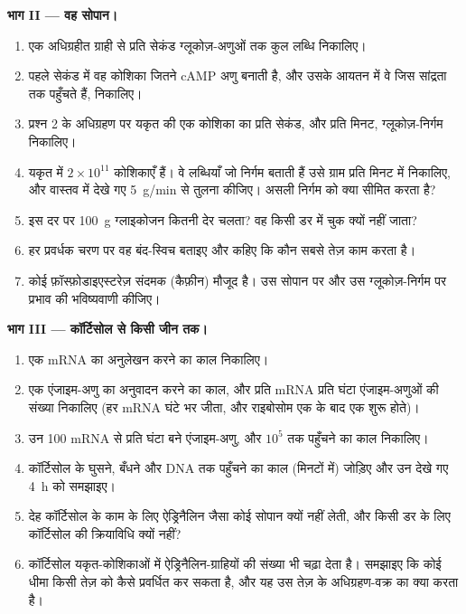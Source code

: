 \begin{problem}
\medskip
\noindent\textbf{भाग II --- वह सोपान।}
\begin{enumerate}[resume]
  \item एक अधिग्रहीत ग्राही से प्रति सेकंड ग्लूकोज़-अणुओं तक
        कुल लब्धि निकालिए।
  \item पहले सेकंड में वह कोशिका जितने cAMP अणु बनाती है, और
        उसके आयतन में वे जिस सांद्रता तक पहुँचते हैं, निकालिए।
  \item प्रश्न 2 के अधिग्रहण पर यकृत की एक कोशिका का प्रति सेकंड,
        और प्रति मिनट, ग्लूकोज़-निर्गम निकालिए।
  \item यकृत में $2\times 10^{11}$ कोशिकाएँ हैं। वे लब्धियाँ जो
        निर्गम बताती हैं उसे ग्राम प्रति मिनट में निकालिए, और वास्तव में देखे गए
        \qty{5}{g/min} से तुलना कीजिए। असली निर्गम को क्या सीमित करता है?
  \item इस दर पर \qty{100}{g} ग्लाइकोजन कितनी देर चलता? वह किसी डर में
        चुक क्यों नहीं जाता?
  \item हर प्रवर्धक चरण पर वह बंद-स्विच बताइए और कहिए कि कौन
        सबसे तेज़ काम करता है।
  \item कोई फ़ॉस्फ़ोडाइएस्टरेज़ संदमक (कैफ़ीन) मौजूद है। उस सोपान पर
        और उस ग्लूकोज़-निर्गम पर प्रभाव की भविष्यवाणी कीजिए।
\end{enumerate}

\medskip
\noindent\textbf{भाग III --- कॉर्टिसोल से किसी जीन तक।}
\begin{enumerate}[resume]
  \item एक mRNA का अनुलेखन करने का काल निकालिए।
  \item एक एंजाइम-अणु का अनुवादन करने का काल, और प्रति mRNA प्रति घंटा
        एंजाइम-अणुओं की संख्या निकालिए (हर mRNA घंटे भर
        जीता, और राइबोसोम एक के बाद एक शुरू होते)।
  \item उन \num{100} mRNA से प्रति घंटा बने एंजाइम-अणु, और
        $10^{5}$ तक पहुँचने का काल निकालिए।
  \item कॉर्टिसोल के घुसने, बँधने और DNA तक पहुँचने का काल
        (मिनटों में) जोड़िए और उन देखे गए \qty{4}{h} को समझाइए।
  \item देह कॉर्टिसोल के काम के लिए ऐड्रिनैलिन जैसा कोई सोपान क्यों नहीं
        लेती, और किसी डर के लिए कॉर्टिसोल की क्रियाविधि क्यों नहीं?
  \item कॉर्टिसोल यकृत-कोशिकाओं में ऐड्रिनैलिन-ग्राहियों की संख्या भी
        चढ़ा देता है। समझाइए कि कोई धीमा  किसी तेज़  को कैसे
        प्रवर्धित कर सकता है, और यह उस तेज़ के अधिग्रहण-वक्र का क्या करता है।
\end{enumerate}


\end{problem}
